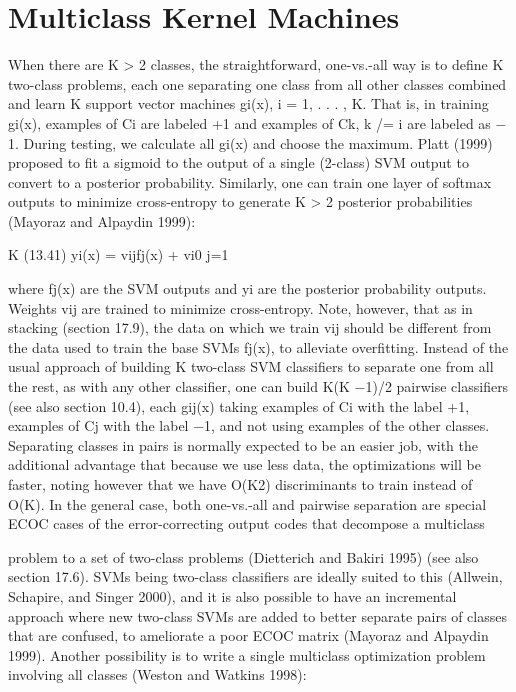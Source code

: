 \section{Multiclass Kernel Machines}

When there are K > 2 classes, the straightforward, one-vs.-all way is to define K two-class problems, each one separating one class from all other classes combined and learn K support vector machines gi(x), i = 1, . . . , K. That is, in training gi(x), examples of Ci are labeled +1 and examples of Ck, k /= i are labeled as $-$1. During testing, we calculate all gi(x) and choose the maximum. Platt (1999) proposed to fit a sigmoid to the output of a single (2-class) SVM output to convert to a posterior probability. Similarly, one can train one layer of softmax outputs to minimize cross-entropy to generate K > 2 posterior probabilities (Mayoraz and Alpaydin 1999):

K (13.41) yi(x) = vijfj(x) + vi0 j=1

where fj(x) are the SVM outputs and yi are the posterior probability outputs. Weights vij are trained to minimize cross-entropy. Note, however, that as in stacking (section 17.9), the data on which we train vij should be different from the data used to train the base SVMs fj(x), to alleviate overfitting. Instead of the usual approach of building K two-class SVM classifiers to separate one from all the rest, as with any other classifier, one can build K(K $-$1)/2 pairwise classifiers (see also section 10.4), each gij(x) taking examples of Ci with the label +1, examples of Cj with the label $-$1, and not using examples of the other classes. Separating classes in pairs is normally expected to be an easier job, with the additional advantage that because we use less data, the optimizations will be faster, noting however that we have O(K2) discriminants to train instead of O(K). In the general case, both one-vs.-all and pairwise separation are special ECOC cases of the error-correcting output codes that decompose a multiclass

problem to a set of two-class problems (Dietterich and Bakiri 1995) (see also section 17.6). SVMs being two-class classifiers are ideally suited to this (Allwein, Schapire, and Singer 2000), and it is also possible to have an incremental approach where new two-class SVMs are added to better separate pairs of classes that are confused, to ameliorate a poor ECOC matrix (Mayoraz and Alpaydin 1999). Another possibility is to write a single multiclass optimization problem involving all classes (Weston and Watkins 1998):

